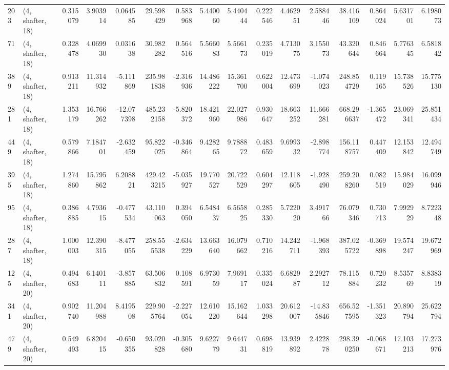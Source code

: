 \begin{tabular}{llrrrrrrrrrrrrrr}
203 &  (4, shafter, 18) &   0.315079 &   3.903914 &   0.064585 &    29.598429 &   0.583968 &   5.440060 &   5.440444 &  0.222546 &   4.462951 &   2.588446 &     38.416109 &    0.864024 &    5.631701 &    6.198073 \\
71  &  (4, shafter, 18) &   0.328478 &   4.069930 &   0.031638 &    30.982282 &   0.564516 &   5.566083 &   5.566173 &  0.235019 &   4.713075 &   3.155073 &     43.320644 &    0.846664 &    5.776345 &    6.581842 \\
389 &  (4, shafter, 18) &   0.913211 &  11.314932 &  -5.111869 &   235.981838 &  -2.316936 &  14.486222 &  15.361700 &  0.622004 &  12.473699 &  -1.074023 &    248.854729 &    0.119165 &   15.738526 &   15.775130 \\
281 &  (4, shafter, 18) &   1.353179 &  16.766262 & -12.077398 &   485.232158 &  -5.820372 &  18.421960 &  22.027986 &  0.930647 &  18.663252 &  11.666281 &    668.296637 &   -1.365472 &   23.069341 &   25.851434 \\
449 &  (4, shafter, 18) &   0.579866 &   7.184701 &  -2.632459 &    95.822025 &  -0.346864 &   9.428265 &   9.788872 &  0.483659 &   9.699332 &  -2.898774 &    156.118757 &    0.447409 &   12.153842 &   12.494749 \\
395 &  (4, shafter, 18) &   1.274860 &  15.795862 &   6.208821 &   429.423215 &  -5.035927 &  19.770527 &  20.722529 &  0.604297 &  12.118605 &  -1.928490 &    259.208260 &    0.082519 &   15.984029 &   16.099946 \\
95  &  (4, shafter, 18) &   0.386885 &   4.793615 &  -0.477534 &    43.110063 &   0.394050 &   6.548437 &   6.565825 &  0.285330 &   5.722020 &   3.491766 &     76.079346 &    0.730713 &    7.992929 &    8.722348 \\
287 &  (4, shafter, 18) &   1.000003 &  12.390315 &  -8.477055 &   258.555538 &  -2.634229 &  13.663640 &  16.079662 &  0.710216 &  14.242711 &  -1.968393 &    387.025722 &   -0.369898 &   19.574247 &   19.672969 \\
125 &  (4, shafter, 20) &   0.494683 &   6.140111 &  -3.857885 &    63.506832 &   0.108591 &   6.973059 &   7.969117 &  0.335024 &   6.682987 &   2.292712 &     78.115884 &    0.720232 &    8.535769 &    8.838319 \\
341 &  (4, shafter, 20) &   0.902740 &  11.204988 &   8.419508 &   229.905764 &  -2.227054 &  12.610220 &  15.162644 &  1.033298 &  20.612007 & -14.835846 &    656.527595 &   -1.351323 &   20.890794 &   25.622794 \\
479 &  (4, shafter, 20) &   0.549493 &   6.820415 &  -0.650355 &    93.020828 &  -0.305680 &   9.622779 &   9.644731 &  0.698819 &  13.939892 &   2.422878 &    298.390250 &   -0.068671 &   17.103213 &   17.273976 \\

\end{tabular}
